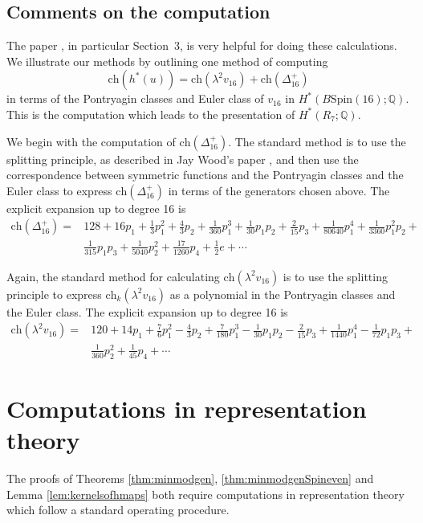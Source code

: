 \documentclass[twoside,a4paper,reqno,11pt]{amsart}
\newcommand{\Q}{\mathbb{Q}}
\newcommand{\Spin}{\mathrm{Spin}}
\newcommand{\ch}{\mathrm{ch}}
\begin{document}
\subsection{Comments on the computation} \label{subsec:calcs}

The paper \cite{MR3903053}, in particular Section~3, is very helpful for doing these calculations. We illustrate our methods by outlining one method of computing
\[ \ch(h^*(u)) = \ch(\lambda^2 v_{16}) + \ch(\Delta_{16}^+) \]
in terms of the Pontryagin classes and Euler class of $v_{16}$ in $H^*(B\Spin(16); \Q)$.  This is the computation which leads to  the presentation of $H^*(R_7; \Q)$.

We begin with the computation of $\ch(\Delta_{16}^+)$.  The standard method is to use the splitting principle, as described in Jay Wood's paper \cite{MR1443417}, and then use the correspondence between symmetric functions and the Pontryagin classes and the Euler class to express $\ch(\Delta_{16}^+)$ in terms of the generators chosen above. The explicit expansion up to degree 16 is
\begin{align*}
\ch(\Delta_{16}^+) = {} & 128 + 16p_1 + \frac{1}{3} p_1^2 + \frac{4}{3} p_2 + \frac{1}{360} p_1^3 + \frac{1}{30} p_1 p_2 + \frac{2}{15} p_3 + \frac{1}{80640} p_1^4 + \frac{1}{3360} p_1^2 p_2 + {} \\ 
& \frac{1}{315} p_1 p_3 + \frac{1}{5040} p_2^2 + \frac{17}{1260} p_4 + \frac{1}{2} e + \cdots
\end{align*}

Again, the standard method for calculating $\ch(\lambda^2 v_{16})$ is to use the splitting principle to express $\ch_{k}(\lambda^2 v_{16})$ as a polynomial in the Pontryagin classes and the Euler class. The explicit expansion up to degree 16 is
\begin{align*}
\ch(\lambda^2 v_{16}) = {} & 120 + 14 p_1 + \frac{7}{6} p_1^2 - \frac{4}{3} p_2 + \frac{7}{180} p_1^3 - \frac{1}{30} p_1 p_2 - \frac{2}{15} p_3 + \frac{1}{1440} p_1^4 - \frac{1}{72} p_1 p_3 + {} \\ 
& \frac{1}{360} p_2^2 + \frac{1}{45} p_4 + \cdots
\end{align*}


\section{Computations in representation theory} \label{sec:reptheorycomps}

The proofs of Theorems \ref{thm:minmodgen}, \ref{thm:minmodgenSpineven} and Lemma \ref{lem:kernelsofhmaps} both require computations in representation theory which follow a standard operating procedure. 
\end{document}
